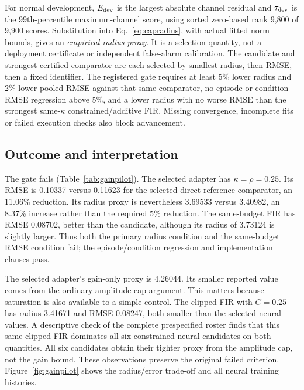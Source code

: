 For normal development, $E_{\rm dev}$ is the largest absolute channel residual and $\tau_{\rm dev}$ is the 99th-percentile maximum-channel score, using sorted zero-based rank 9,800 of 9,900 scores. Substitution into Eq.~\eqref{eq:capradius}, with actual fitted norm bounds, gives an \emph{empirical radius proxy}. It is a selection quantity, not a deployment certificate or independent false-alarm calibration. The candidate and strongest certified comparator are each selected by smallest radius, then RMSE, then a fixed identifier. The registered gate requires at least 5\% lower radius and 2\% lower pooled RMSE against that same comparator, no episode or condition RMSE regression above 5\%, and a lower radius with no worse RMSE than the strongest same-$\kappa$ constrained/additive FIR. Missing convergence, incomplete fits or failed execution checks also block advancement.

\begin{table}[t]\centering\small\setlength{\tabcolsep}{7pt}
\caption{All 33 normal-development outcomes. $K$ is the actual certified history-gain bound; $C$ bounds the observation-dependent correction for the paired contrast. Radius is the smaller valid gain/cap proxy. A dash means that quantity is unavailable, not zero. All rows use the same 9,900 development targets. ``Late loss drop'' marks more than 1\% training-MSE improvement from epochs 31 to 40; it is not a global convergence test.}\label{tab:gainpilot}

\end{table}

\subsection{Outcome and interpretation}
The gate fails (Table~\ref{tab:gainpilot}). The selected adapter has $\kappa=\rho=0.25$. Its RMSE is 0.10337 versus 0.11623 for the selected direct-reference comparator, an 11.06\% reduction. Its radius proxy is nevertheless 3.69533 versus 3.40982, an 8.37\% increase rather than the required 5\% reduction. The same-budget FIR has RMSE 0.08702, better than the candidate, although its radius of 3.73124 is slightly larger. Thus both the primary radius condition and the same-budget RMSE condition fail; the episode/condition regression and implementation clauses pass.

The selected adapter's gain-only proxy is 4.26044. Its smaller reported value comes from the ordinary amplitude-cap argument. This matters because saturation is also available to a simple control. The clipped FIR with $C=0.25$ has radius 3.41671 and RMSE 0.08247, both smaller than the selected neural values. A descriptive check of the complete prespecified roster finds that this same clipped FIR dominates all six constrained neural candidates on both quantities. All six candidates obtain their tighter proxy from the amplitude cap, not the gain bound. These observations preserve the original failed criterion. Figure~\ref{fig:gainpilot} shows the radius/error trade-off and all neural training histories.

